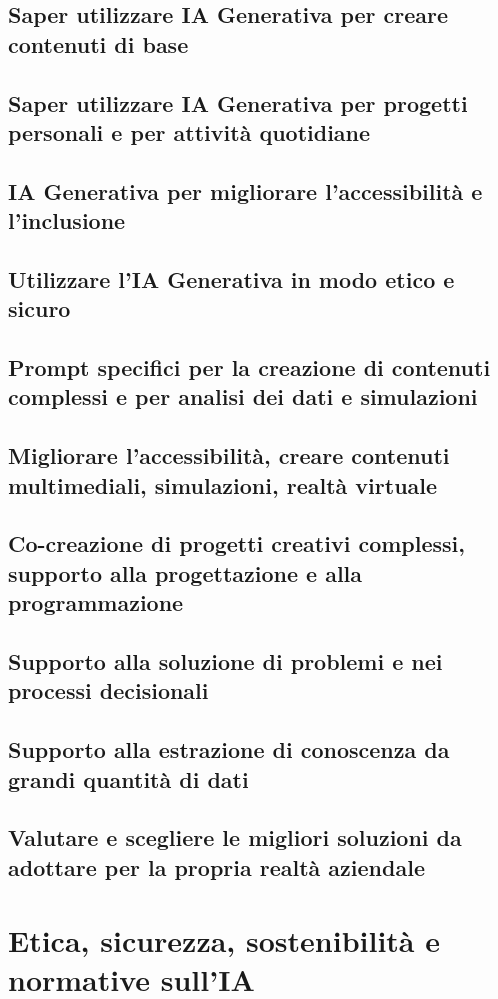     \subsection{Saper utilizzare IA Generativa per creare contenuti di base}
    \subsection{Saper utilizzare IA Generativa per progetti personali e per attività quotidiane}
    \subsection{IA Generativa per migliorare l’accessibilità e l’inclusione}
    \subsection{Utilizzare l’IA Generativa in modo etico e sicuro}
    \subsection{Prompt specifici per la creazione di contenuti complessi e per analisi dei dati e simulazioni}
    \subsection{Migliorare l’accessibilità, creare contenuti multimediali, simulazioni, realtà virtuale}
    \subsection{Co-creazione di progetti creativi complessi, supporto alla progettazione e alla programmazione}
    \subsection{Supporto alla soluzione di problemi e nei processi decisionali}
    \subsection{Supporto alla estrazione di conoscenza da grandi quantità di dati}
    \subsection{Valutare e scegliere le migliori soluzioni da adottare per la propria realtà aziendale}

\section{Etica, sicurezza, sostenibilità e normative sull'IA}
